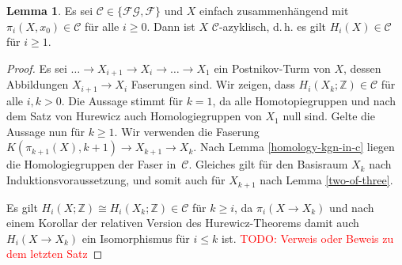 \documentclass[11pt, a4paper, german]{article}
\theoremstyle{definition}
\newtheorem{lem}{Lemma}
\theoremstyle{remark}
\newcommand{\TODO}[1]{\textcolor{red}{TODO: #1}} %
\newcommand{\Z}{\mathbb{Z}} %
\newcommand{\SC}{\mathcal{C}} %
\newcommand{\FG}{\mathcal{FG}} %
\newcommand{\F}{\mathcal{F}} %
\renewcommand{\dh}{d.\,h.} %
\begin{document}
\begin{lem}\label{homotopy-in-c-implies-homology-in-c}
  Es sei $\SC \in \{ \FG, \F \}$ und
  $X$ einfach zusammenhängend mit $\pi_i(X, x_0) \in \SC$ für alle $i \geq 0$.
  Dann ist $X$ $\SC$-azyklisch, \dh{} es gilt $H_i(X) \in \SC$ für $i \geq 1$.
\end{lem}

\begin{proof}
  Es sei $\ldots \to X_{i+1} \to X_i \to \ldots \to X_1$ ein Postnikov-Turm von $X$, dessen Abbildungen $X_{i+1} \to X_i$ Faserungen sind.
  Wir zeigen, dass $H_i(X_k; \Z) \in \SC$ für alle $i, k > 0$.
  Die Aussage stimmt für $k = 1$, da alle Homotopiegruppen und nach dem Satz von Hurewicz auch Homologiegruppen von $X_1$ null sind.
  Gelte die Aussage nun für $k \geq 1$.
  Wir verwenden die Faserung $K(\pi_{k+1}(X), k{+}1) \to X_{k+1} \to X_k$.
  Nach Lemma \ref{homology-kgn-in-c} liegen die Homologiegruppen der Faser in~$\SC$.
  Gleiches gilt für den Basisraum $X_k$ nach Induktionsvoraussetzung,
  und somit auch für $X_{k+1}$ nach Lemma \ref{two-of-three}.

  Es gilt $H_i(X; \Z) \cong H_i(X_k; \Z) \in \SC$ für $k \geq i$, da $\pi_i(X \to X_k)$ und nach einem Korollar der relativen Version des Hurewicz-Theorems damit auch $H_i(X \to X_k)$ ein Isomorphismus für $i \leq k$ ist.
  \TODO{Verweis oder Beweis zu dem letzten Satz}
\end{proof}
\end{document}
